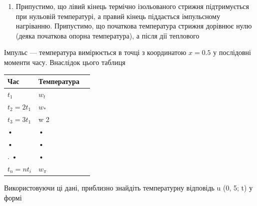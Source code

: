 \documentclass[
]{article}
\newcounter{none} %
\providecommand{\tightlist}{%
  \setlength{\itemsep}{0pt}\setlength{\parskip}{0pt}}
\begin{document}
\begin{enumerate}
\def\labelenumi{\arabic{enumi}.}
\setcounter{enumi}{2}
\tightlist
\item
  Припустимо, що лівий кінець термічно ізольованого стрижня
  підтримується при нульовій температурі, а правий кінець піддається
  імпульсному нагріванню. Припустимо, що початкова температура стрижня
  дорівнює нулю (деяка початкова опорна температура), а після дії
  теплового
\end{enumerate}

Імпульс --- температура вимірюється в точці з координатою \(x\!=\!0.5\)
у послідовні моменти часу. Внаслідок цього таблиця

{\def\LTcaptype{none} %
\begin{longtable}[]{@{}lll@{}}
\toprule\noalign{}
Час & Температура & \\
\midrule\noalign{}
\endhead
\bottomrule\noalign{}
\endlastfoot
\(t_1\) & \(w_t\) & \\
\(t_2 = 2t_1\) & \(w_*\) & \\
\(t_3 = 3t_1\) & w 2 & \\
• & • & \\
• & • & \\
. • & • & \\
\(t_n = nt_i\) & \(w_{\pi}\) & \\
\end{longtable}
}

Використовуючи ці дані, приблизно знайдіть температурну відповідь u (0,
5; t) у формі
\end{document}
